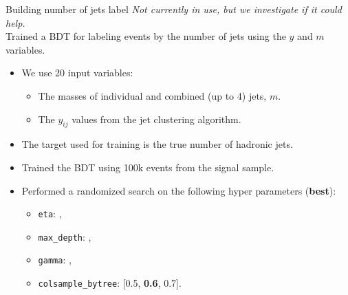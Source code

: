 
\begin{frame}{Building number of jets label}%
    \textit{Not currently in use, but we investigate if it could help.} \\
    Trained a BDT for labeling events by the number of jets using the $y$ and $m$ variables.
    \begin{itemize}
        \item We use 20 input variables:
        \begin{itemize}
            \item The masses of individual and combined (up to 4) jets, $m$.
            \item The $y_{ij}$ values from the jet clustering algorithm.
        \end{itemize}
        \item The target used for training is the true number of hadronic jets.
        \item Trained the BDT using 100k events from the signal sample.
        \item Performed a randomized search on the following hyper parameters (\textbf{best}):
        \begin{itemize}
            \item \texttt{eta}: \quad\quad\quad\quad\quad\quad\quad [0.05, 0.10, \textbf{0.20}, 0.30, 0.35] ,
            \item \texttt{max\_depth}: \quad\quad\quad\quad [2, 3, 4, \textbf{5}, 6],
            \item \texttt{gamma}: \quad\quad\quad\quad\quad\quad [3, 1, \textbf{0.5}, 1e-01, 1e-02],
            \item \texttt{colsample\_bytree}: \hspace{0.3em} [0.5, \textbf{0.6}, 0.7].
        \end{itemize}
    \end{itemize}
\end{frame}

